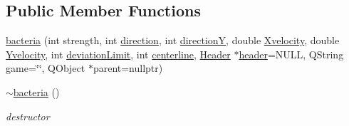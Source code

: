\subsection*{Public Member Functions}
\begin{DoxyCompactItemize}
\item 
\hyperlink{classbacteria_a9c1bb600d594429c64446a9dff56f398}{bacteria} (int strength, int \hyperlink{classbacteria_ae0262e42fe93ae2fcd6cb77f53be8d05}{direction}, int \hyperlink{classbacteria_ab4cdc40bc26aa012391f7543f7e0d54b}{direction\-Y}, double \hyperlink{classbacteria_a4b0a914494a4d5c26b12181f7546d3e1}{Xvelocity}, double \hyperlink{classbacteria_ab0faabfc046869969c36b88ecd105702}{Yvelocity}, int \hyperlink{classbacteria_aa97d75555e88a076c05dcc217b107b54}{deviation\-Limit}, int \hyperlink{classbacteria_a512cfc4c7afef0e3bf8f76bd53072de9}{centerline}, \hyperlink{classHeader}{Header} $\ast$\hyperlink{classGrabbable_a97db8193dec83a8086352f80a30b2038}{header}=N\-U\-L\-L, Q\-String game=\char`\"{}\char`\"{}, Q\-Object $\ast$parent=nullptr)
\item 
\hypertarget{classbacteria_afd6e4d4c7575387a8ffdcc7a40287507}{\hyperlink{classbacteria_afd6e4d4c7575387a8ffdcc7a40287507}{$\sim$bacteria} ()}\label{classbacteria_afd6e4d4c7575387a8ffdcc7a40287507}

\begin{DoxyCompactList}\small\item\em destructor \end{DoxyCompactList}\end{DoxyCompactItemize}
